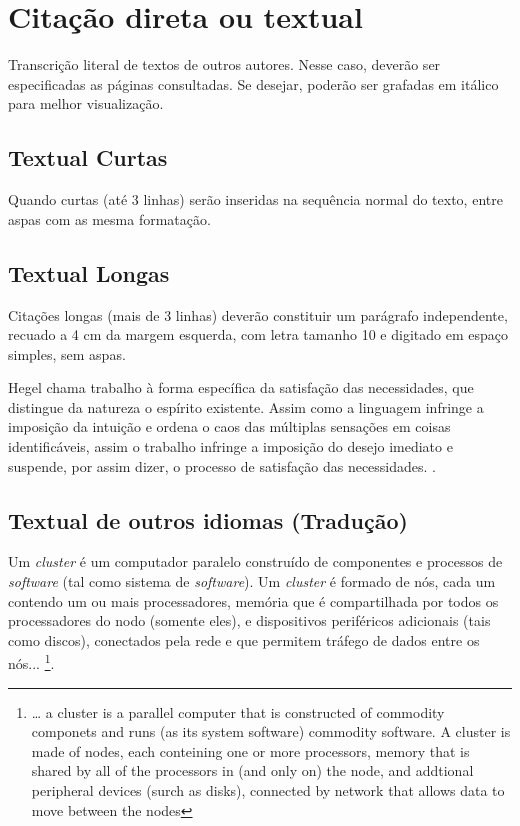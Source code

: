 \section{\esp Citação direta ou textual}

Transcrição literal de textos de outros autores. Nesse caso, deverão ser especificadas as páginas consultadas. 
Se desejar, poderão ser grafadas em itálico para melhor visualização.

\subsection{\esp Textual Curtas}

Quando curtas (até 3 linhas) serão inseridas na sequência normal do texto, entre aspas com as mesma formatação.

\subsection{\esp Textual Longas}

Citações longas (mais de 3 linhas) deverão constituir um parágrafo independente, recuado a 4 cm da margem esquerda, 
com letra tamanho 10 e digitado em espaço simples, sem aspas.
\begin{citacaodireta}
Hegel chama trabalho à forma específica da satisfação das necessidades, que
distingue da natureza o espírito existente. Assim como a linguagem infringe
a imposição da intuição e ordena o caos das múltiplas sensações em coisas
identificáveis, assim o trabalho infringe a imposição do \hspace{0.1cm}desejo \hspace{0.1cm}imediato \hspace{0.1cm}e
suspende, por assim dizer, o processo de satisfação das necessidades.
\cite[25]{habermas}.
\end{citacaodireta}



\subsection{\esp Textual de outros idiomas (Tradução)}

\begin{citacaodireta} 
Um \textit{cluster} é um computador paralelo construído de componentes e processos de \textit{software} (tal como sistema de \textit{software}). 
Um \textit{cluster} é formado de nós, cada um contendo um ou mais processadores, memória que é compartilhada por todos os processadores do nodo 
(somente eles), e dispositivos periféricos adicionais (tais como discos), conectados pela rede e que permitem tráfego de dados entre os nós...
\cite[p. 10, tradução nossa]{groupp}\footnote {  … a cluster is a parallel computer that is constructed of commodity  componets and runs 
(as its system software) commodity software. A cluster is made of nodes, each conteining one or more processors, memory that is  shared 
by all of the processors in (and only on) the node, and addtional peripheral devices (surch as disks),
 connected by network that allows data to move between the nodes}.
\end{citacaodireta}
 

